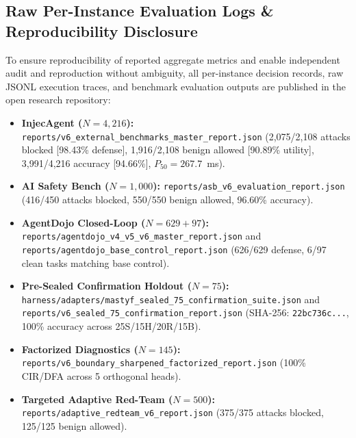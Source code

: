 \documentclass[10pt,journal,compsoc]{IEEEtran}
\begin{document}
\subsection{Raw Per-Instance Evaluation Logs \& Reproducibility Disclosure}
To ensure reproducibility of reported aggregate metrics and enable independent audit and reproduction without ambiguity, all per-instance decision records, raw JSONL execution traces, and benchmark evaluation outputs are published in the open research repository:
\begin{itemize}
    \item \textbf{InjecAgent ($N = 4,216$):} \texttt{reports/v6\_external\_benchmarks\_master\_report.json} (2,075/2,108 attacks blocked [98.43\% defense], 1,916/2,108 benign allowed [90.89\% utility], 3,991/4,216 accuracy [94.66\%], $P_{50} = 267.7$~ms).
    \item \textbf{AI Safety Bench ($N = 1,000$):} \texttt{reports/asb\_v6\_evaluation\_report.json} (416/450 attacks blocked, 550/550 benign allowed, 96.60\% accuracy).
    \item \textbf{AgentDojo Closed-Loop ($N = 629 + 97$):} \texttt{reports/agentdojo\_v4\_v5\_v6\_master\_report.json} and \texttt{reports/agentdojo\_base\_control\_report.json} (626/629 defense, 6/97 clean tasks matching base control).
    \item \textbf{Pre-Sealed Confirmation Holdout ($N = 75$):} \texttt{harness/adapters/mastyf\_sealed\_75\_confirmation\_suite.json} and \texttt{reports/v6\_sealed\_75\_confirmation\_report.json} (SHA-256: \texttt{22bc736c...}, 100\% accuracy across 25S/15H/20R/15B).
    \item \textbf{Factorized Diagnostics ($N = 145$):} \texttt{reports/v6\_boundary\_sharpened\_factorized\_report.json} (100\% CIR/DFA across 5 orthogonal heads).
    \item \textbf{Targeted Adaptive Red-Team ($N = 500$):} \texttt{reports/adaptive\_redteam\_v6\_report.json} (375/375 attacks blocked, 125/125 benign allowed).
\end{itemize}
\end{document}
